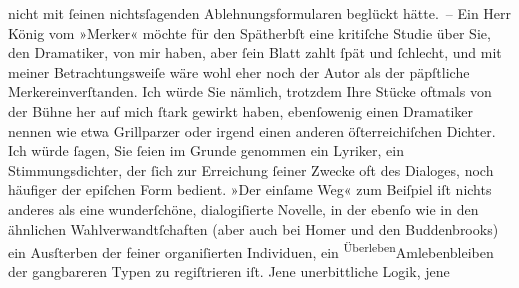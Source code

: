          nicht mit{ }ſeinen nichtsſagenden Ablehnungsformularen beglückt hätte. – Ein Herr König vom »Merker« möchte für den Spätherbſt eine kritiſche Studie über Sie, den Dramatiker,
          von mir haben, aber{ }ſein Blatt zahlt{ }ſpät und{ }ſchlecht, und mit meiner Betrachtungsweiſe
          wäre wohl eher noch der Autor als der päpſtliche Merkereinverſtanden. Ich würde Sie nämlich, trotzdem
          Ihre Stücke oftmals von der Bühne her auf mich{ }ſtark gewirkt haben, ebenſowenig einen
          Dramatiker nennen wie etwa Grillparzer oder irgend
          einen anderen öſterreichiſchen Dichter. Ich würde{ }ſagen, Sie{ }ſeien im Grunde genommen ein Lyriker, ein Stimmungsdichter, der{ }ſich zu\introOben{}r\introOben{}{ } Erreichung{ }ſeiner Zwecke oft des Dialoges, noch
          häufiger der epiſchen Form bedient. »Der einſame Weg«
          zum Beiſpiel iſt nichts \introOben{}anderes\introOben{} als eine wunderſchöne,
          dialogiſierte Novelle, in der ebenſo wie in den ähnlichen Wahlverwandtſchaften (aber auch bei Homer
          und den Buddenbrooks) ein Ausſterben der feiner
          organiſierten Individuen, ein \substVorne{}\textsuperscript{Überleben}\substDazwischen{}Amlebenbleiben\substHinten{} der gangbareren Typen zu regiſtrieren iſt. Jene unerbittliche Logik, jene
